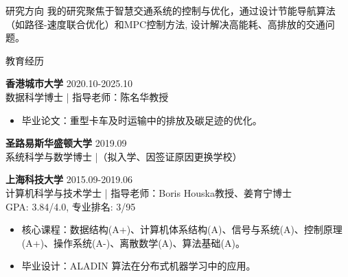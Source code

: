 \documentclass{resume} %
\newcommand{\trianglebullet}{$\mbox{\ensuremath{\rhd}}$}
\begin{document}



\begin{rSection}{研究方向}
    我的研究聚焦于智慧交通系统的控制与优化，通过设计节能导航算法（如路径-速度联合优化）和MPC控制方法, 设计解决高能耗、高排放的交通问题。
\end{rSection}

\begin{rSection}{教育经历}

    \textbf{香港城市大学}  \hfill {2020.10-2025.10} 
    \\ 数据科学博士 | 指导老师：陈名华教授 
    \begin{itemize}
        \item 毕业论文：重型卡车及时运输中的排放及碳足迹的优化。
    \end{itemize}

    \textbf{圣路易斯华盛顿大学}  \hfill {2019.09}
    \\ 系统科学与数学博士 |（拟入学、因签证原因更换学校） 

    \textbf{上海科技大学}  \hfill {2015.09-2019.06} 
    \\ 计算机科学与技术学士 | 指导老师：Boris Houska教授、姜育宁博士 
    \\ GPA: 3.84/4.0, 专业排名: 3/95
    \begin{itemize}
        \item 核心课程：数据结构(A+)、计算机体系结构(A)、信号与系统(A)、控制原理(A+)、操作系统(A-)、离散数学(A)、算法基础(A)。
        \item 毕业设计：ALADIN 算法在分布式机器学习中的应用。
    \end{itemize}



\end{rSection}
\end{document}
